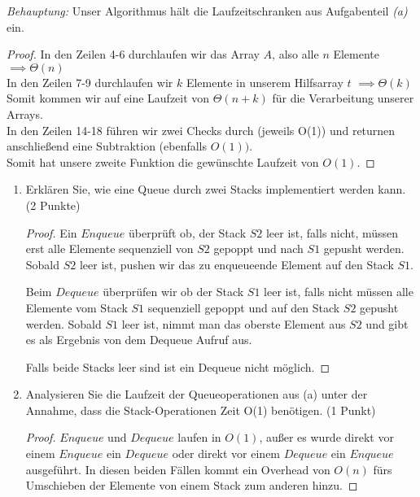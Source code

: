 \documentclass[ngerman,landscape,twocolumn]{adtexsheet}
\begin{document}
\emph{Behauptung:} Unser Algorithmus hält die Laufzeitschranken aus Aufgabenteil \emph{(a)} ein.
\begin{proof}
    In den Zeilen 4-6 durchlaufen wir das Array $A$, also alle $n$ Elemente $\implies \Theta(n)$ \\
    In den Zeilen 7-9 durchlaufen wir $k$ Elemente in unserem Hilfsarray $t$ $\implies \Theta(k)$\\
    Somit kommen wir auf eine Laufzeit von $\Theta(n+k)$ für die Verarbeitung unserer Arrays.\\
    In den Zeilen 14-18 führen wir zwei Checks durch (jeweils O(1)) und returnen anschließend eine Subtraktion (ebenfalls $O(1))$.\\
    Somit hat unsere zweite Funktion die gewünschte Laufzeit von $O(1)$.
\end{proof}
\begin{question}
    \begin{enumerate}
        \item Erklären Sie, wie eine Queue durch zwei Stacks implementiert werden kann. (2 Punkte)
        
        \begin{proof}
            Ein $Enqueue$ überprüft ob, der Stack $S2$ leer ist, falls nicht, müssen erst alle Elemente sequenziell von $S2$ gepoppt und nach $S1$ gepusht werden. Sobald $S2$ leer ist, pushen wir das zu enqueueende Element auf den Stack $S1$.
            
            Beim $Dequeue$ überprüfen wir ob der Stack $S1$ leer ist, falls nicht müssen alle Elemente vom Stack $S1$ sequenziell gepoppt und auf den Stack $S2$ gepusht werden. Sobald $S1$ leer ist, nimmt man das oberste Element aus $S2$ und gibt es als Ergebnis von dem Dequeue Aufruf aus.
            
            Falls beide Stacks leer sind ist ein Dequeue nicht möglich.
        \end{proof}
        \item Analysieren Sie die Laufzeit der Queueoperationen aus (a) unter der Annahme, dass die Stack-Operationen Zeit O(1) benötigen. (1 Punkt)
        \begin{proof}
            $Enqueue$ und $Dequeue$ laufen in $O(1)$, außer es wurde direkt vor einem $Enqueue$ ein $Dequeue$ oder direkt vor einem $Dequeue$ ein $Enqueue$ ausgeführt. In diesen beiden Fällen kommt ein Overhead von $O(n)$ fürs Umschieben der Elemente von einem Stack zum anderen hinzu.
        \end{proof}
    \end{enumerate} 
\end{question}
\end{document}
